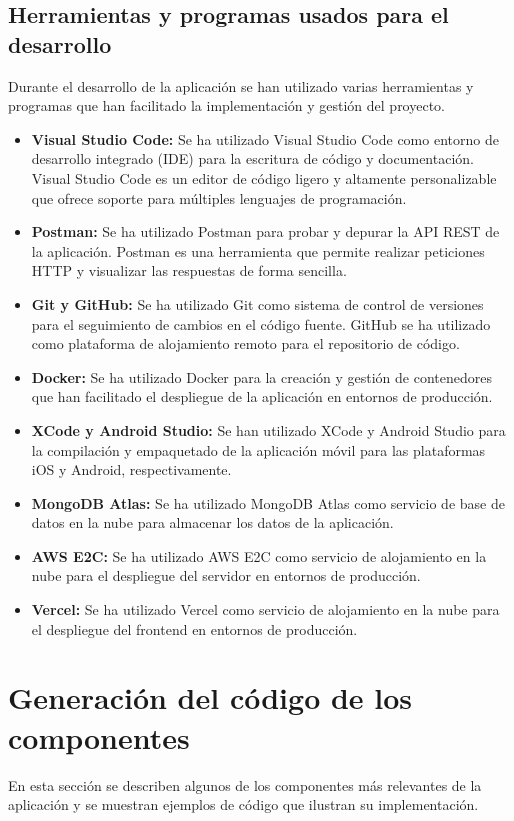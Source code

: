 \subsection{Herramientas y programas usados para el desarrollo}
Durante el desarrollo de la aplicación se han utilizado varias herramientas y programas que han facilitado la implementación y gestión del proyecto.
\begin {itemize}
\item {\bfseries Visual Studio Code:} Se ha utilizado Visual Studio Code como entorno de desarrollo integrado (IDE) para la escritura de código y documentación. Visual Studio Code es un editor de código ligero y altamente personalizable que ofrece soporte para múltiples lenguajes de programación.
\item {\bfseries Postman:} Se ha utilizado Postman para probar y depurar la API REST de la aplicación. Postman es una herramienta que permite realizar peticiones HTTP y visualizar las respuestas de forma sencilla.
\item {\bfseries Git y GitHub:} Se ha utilizado Git como sistema de control de versiones para el seguimiento de cambios en el código fuente. GitHub se ha utilizado como plataforma de alojamiento remoto para el repositorio de código.
\item {\bfseries Docker:} Se ha utilizado Docker para la creación y gestión de contenedores que han facilitado el despliegue de la aplicación en entornos de producción.
\item {\bfseries XCode y Android Studio:} Se han utilizado XCode y Android Studio para la compilación y empaquetado de la aplicación móvil para las plataformas iOS y Android, respectivamente.
\item {\bfseries MongoDB Atlas:} Se ha utilizado MongoDB Atlas como servicio de base de datos en la nube para almacenar los datos de la aplicación.
\item {\bfseries AWS E2C:} Se ha utilizado AWS E2C como servicio de alojamiento en la nube para el despliegue del servidor en entornos de producción.
\item {\bfseries Vercel:} Se ha utilizado Vercel como servicio de alojamiento en la nube para el despliegue del frontend en entornos de producción.
\end {itemize}

\section{Generación del código de los componentes}
En esta sección se describen algunos de los componentes más relevantes de la aplicación y se muestran ejemplos de código que ilustran su implementación.

